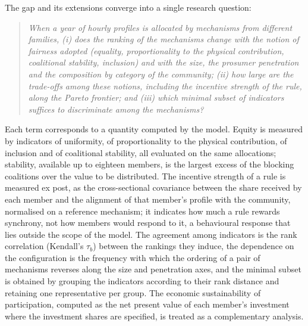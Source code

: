 The gap and its extensions converge into a single research question:

\begin{quote}
\emph{When a year of hourly profiles is allocated by mechanisms from different families, (i) does the ranking of the mechanisms change with the notion of fairness adopted (equality, proportionality to the physical contribution, coalitional stability, inclusion) and with the size, the prosumer penetration and the composition by category of the community; (ii) how large are the trade-offs among these notions, including the incentive strength of the rule, along the Pareto frontier; and (iii) which minimal subset of indicators suffices to discriminate among the mechanisms?}
\end{quote}

Each term corresponds to a quantity computed by the model. Equity is measured by indicators of uniformity, of proportionality to the physical contribution, of inclusion and of coalitional stability, all evaluated on the same allocations; stability, available up to eighteen members, is the largest excess of the blocking coalitions over the value to be distributed. The incentive strength of a rule is measured ex post, as the cross-sectional covariance between the share received by each member and the alignment of that member's profile with the community, normalised on a reference mechanism; it indicates how much a rule rewards synchrony, not how members would respond to it, a behavioural response that lies outside the scope of the model. The agreement among indicators is the rank correlation (Kendall's $\tau_b$) between the rankings they induce, the dependence on the configuration is the frequency with which the ordering of a pair of mechanisms reverses along the size and penetration axes, and the minimal subset is obtained by grouping the indicators according to their rank distance and retaining one representative per group. The economic sustainability of participation, computed as the net present value of each member's investment where the investment shares are specified, is treated as a complementary analysis.

